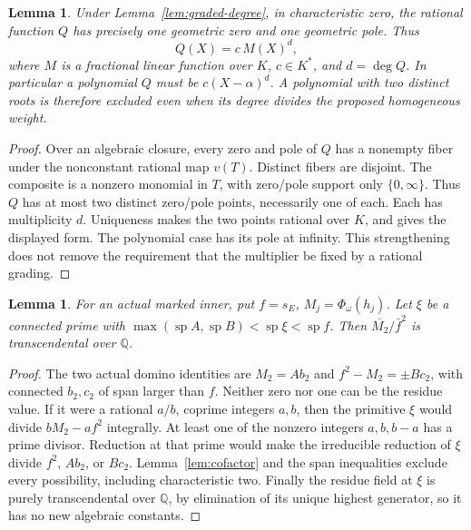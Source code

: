 \documentclass[11pt,a4paper]{amsart}
\numberwithin{equation}{section}
\theoremstyle{plain}
\newtheorem{lemma}[theorem]{Lemma}
\theoremstyle{definition}
\begin{document}
\begin{lemma}\label{lem:grading-shape}
Under Lemma~\ref{lem:graded-degree}, in characteristic zero, the rational function \(Q\) has precisely one geometric zero and one geometric pole.  Thus
\[
 Q(X)=c\,M(X)^d,
\]
where \(M\) is a fractional linear function over \(K\), \(c\in K^*\), and \(d=\deg Q\).  In particular a polynomial \(Q\) must be \(c(X-\alpha)^d\).  A polynomial with two distinct roots is therefore excluded even when its degree divides the proposed homogeneous weight.
\end{lemma}
\begin{proof}
Over an algebraic closure, every zero and pole of \(Q\) has a nonempty fiber under the nonconstant rational map \(v(T)\).  Distinct fibers are disjoint.  The composite is a nonzero monomial in \(T\), with zero/pole support only \(\{0,\infty\}\).  Thus \(Q\) has at most two distinct zero/pole points, necessarily one of each.  Each has multiplicity \(d\).  Uniqueness makes the two points rational over \(K\), and gives the displayed form.  The polynomial case has its pole at infinity.  This strengthening does not remove the requirement that the multiplier be fixed by a rational grading.
\end{proof}

\begin{lemma}\label{lem:arithmetic-transcendence}
For an actual marked inner, put \(f=s_E\), \(M_j=\Phi_\omega(h_j)\).  Let \(\xi\) be a connected prime with
\(\max(\operatorname{sp}A,\operatorname{sp}B)<\operatorname{sp}\xi<\operatorname{sp}f\).
Then \(\overline{M_2}/\bar f^2\) is transcendental over \(\mathbb Q\).
\end{lemma}
\begin{proof}
The two actual domino identities are \(M_2=A b_2\) and \(f^2-M_2=\pm Bc_2\), with connected \(b_2,c_2\) of span larger than \(f\).  Neither zero nor one can be the residue value.  If it were a rational \(a/b\), coprime integers \(a,b\), then the primitive \(\xi\) would divide \(bM_2-af^2\) integrally.  At least one of the nonzero integers \(a,b,b-a\) has a prime divisor.  Reduction at that prime would make the irreducible reduction of \(\xi\) divide \(f^2\), \(Ab_2\), or \(Bc_2\).  Lemma~\ref{lem:cofactor} and the span inequalities exclude every possibility, including characteristic two.  Finally the residue field at \(\xi\) is purely transcendental over \(\mathbb Q\), by elimination of its unique highest generator, so it has no new algebraic constants.
\end{proof}
\end{document}
